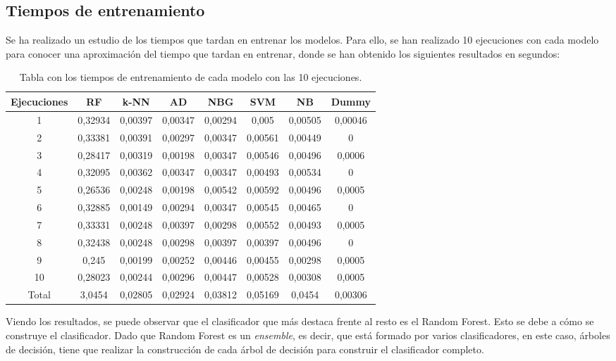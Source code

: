 \subsection{Tiempos de entrenamiento}
Se ha realizado un estudio de los tiempos que tardan en entrenar los modelos. Para ello, se han realizado 10 ejecuciones con cada modelo para conocer una aproximación del tiempo que tardan en entrenar, donde se han obtenido los siguientes resultados en segundos:

\begin{table}[h]
	\begin{center}
		\begin{tabular}{| c | c | c | c | c | c | c | c |}
			\hline
			Ejecuciones & RF & k-NN & AD & NBG & SVM & NB & Dummy \\ \hline
			1 & 0,32934 & 0,00397 & 0,00347 & 0,00294 & 0,005 & 0,00505 & 0,00046 \\
			2 & 0,33381 & 0,00391 & 0,00297 & 0,00347 & 0,00561 & 0,00449 & 0 \\ 
			3 & 0,28417 & 0,00319 & 0,00198 & 0,00347 & 0,00546 & 0,00496 & 0,0006 \\
			4 & 0,32095 & 0,00362 & 0,00347 & 0,00347 & 0,00493 & 0,00534 & 0 \\
			5 & 0,26536 & 0,00248 & 0,00198 & 0,00542 & 0,00592 & 0,00496 & 0,0005 \\
			6 & 0,32885 & 0,00149 & 0,00294 & 0,00347 & 0,00545 & 0,00465 & 0 \\
			7 & 0,33331 & 0,00248 & 0,00397 & 0,00298 & 0,00552 & 0,00493 & 0,0005 \\
			8 & 0,32438 & 0,00248 & 0,00298 & 0,00397 & 0,00397 & 0,00496 & 0 \\
			9 & 0,245 & 0,00199 & 0,00252 & 0,00446 & 0,00455 & 0,00298 & 0,0005 \\
			10 & 0,28023 & 0,00244 & 0,00296 & 0,00447 & 0,00528 & 0,00308 & 0,0005 \\ \hline
			Total & 3,0454 & 0,02805 & 0,02924 & 0,03812 & 0,05169 & 0,0454 & 0,00306 \\ \hline
		\end{tabular}
		\caption{Tabla con los tiempos de entrenamiento de cada modelo con las 10 ejecuciones.}
		\label{tab:tiempos_entrenamiento}
	\end{center}
\end{table}

Viendo los resultados, se puede observar que el clasificador que más destaca frente al resto es el Random Forest. Esto se debe a cómo se construye el clasificador. Dado que Random Forest es un \textit{ensemble}, es decir, que está formado por varios clasificadores, en este caso, árboles de decisión, tiene que realizar la construcción de cada árbol de decisión para construir el clasificador completo. 

